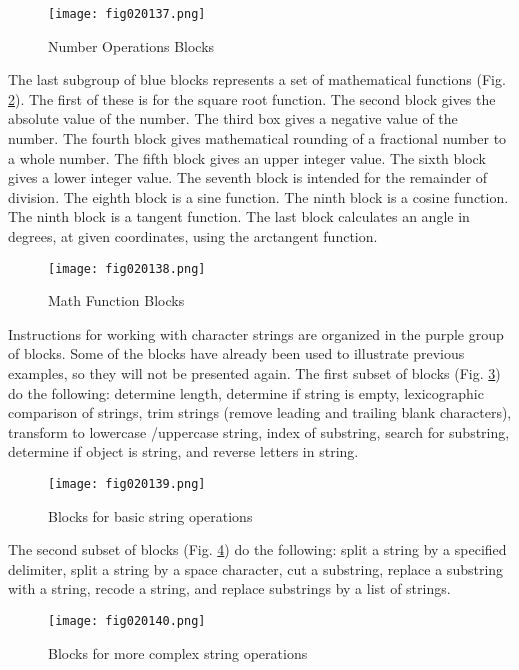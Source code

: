 \begin{figure}[H]
   \centering
   \texttt{[image: fig020137.png]}
   \caption{Number Operations Blocks}
\label{fig020137}
\end{figure}

The last subgroup of blue blocks represents a set of mathematical functions (Fig. \ref{fig020138}). The first of these is for the square root function. The second block gives the absolute value of the number. The third box gives a negative value of the number. The fourth block gives mathematical rounding of a fractional number to a whole number. The fifth block gives an upper integer value. The sixth block gives a lower integer value. The seventh block is intended for the remainder of division. The eighth block is a sine function. The ninth block is a cosine function. The ninth block is a tangent function. The last block calculates an angle in degrees, at given coordinates, using the arctangent function.

\begin{figure}[H]
   \centering
   \texttt{[image: fig020138.png]}
   \caption{Math Function Blocks}
\label{fig020138}
\end{figure}

Instructions for working with character strings are organized in the purple group of blocks. Some of the blocks have already been used to illustrate previous examples, so they will not be presented again. The first subset of blocks (Fig. \ref{fig020139}) do the following: determine length, determine if string is empty, lexicographic comparison of strings, trim strings (remove leading and trailing blank characters), transform to lowercase /uppercase string, index of substring, search for substring, determine if object is string, and reverse letters in string.

\begin{figure}[H]
   \centering
   \texttt{[image: fig020139.png]}
   \caption{Blocks for basic string operations}
\label{fig020139}
\end{figure}

The second subset of blocks (Fig. \ref{fig020140}) do the following: split a string by a specified delimiter, split a string by a space character, cut a substring, replace a substring with a string, recode a string, and replace substrings by a list of strings.

\begin{figure}[H]
   \centering
   \texttt{[image: fig020140.png]}
   \caption{Blocks for more complex string operations}
\label{fig020140}
\end{figure}

